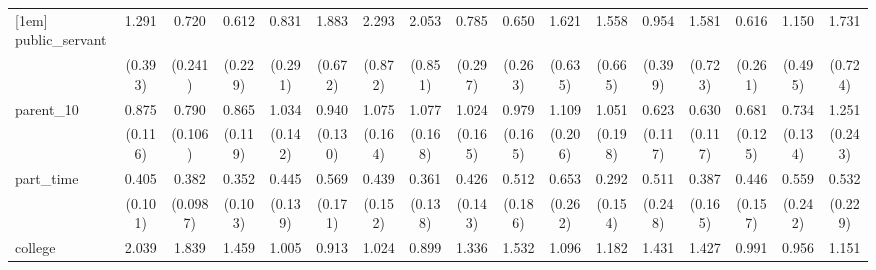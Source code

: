 {\begin{tabular}{l*{16}{c}}
[1em]
public\_servant      &       1.291         &       0.720         &       0.612         &       0.831         &       1.883         &       2.293\sym{*}  &       2.053         &       0.785         &       0.650         &       1.621         &       1.558         &       0.954         &       1.581         &       0.616         &       1.150         &       1.731         \\
                    &     (0.393)         &     (0.241)         &     (0.229)         &     (0.291)         &     (0.672)         &     (0.872)         &     (0.851)         &     (0.297)         &     (0.263)         &     (0.635)         &     (0.665)         &     (0.399)         &     (0.723)         &     (0.261)         &     (0.495)         &     (0.724)         \\
[1em]
parent\_10           &       0.875         &       0.790         &       0.865         &       1.034         &       0.940         &       1.075         &       1.077         &       1.024         &       0.979         &       1.109         &       1.051         &       0.623\sym{*}  &       0.630\sym{*}  &       0.681\sym{*}  &       0.734         &       1.251         \\
                    &     (0.116)         &     (0.106)         &     (0.119)         &     (0.142)         &     (0.130)         &     (0.164)         &     (0.168)         &     (0.165)         &     (0.165)         &     (0.206)         &     (0.198)         &     (0.117)         &     (0.117)         &     (0.125)         &     (0.134)         &     (0.243)         \\
[1em]
part\_time           &       0.405\sym{***}&       0.382\sym{***}&       0.352\sym{***}&       0.445\sym{**} &       0.569         &       0.439\sym{*}  &       0.361\sym{**} &       0.426\sym{*}  &       0.512         &       0.653         &       0.292\sym{*}  &       0.511         &       0.387\sym{*}  &       0.446\sym{*}  &       0.559         &       0.532         \\
                    &     (0.101)         &    (0.0987)         &     (0.103)         &     (0.139)         &     (0.171)         &     (0.152)         &     (0.138)         &     (0.143)         &     (0.186)         &     (0.262)         &     (0.154)         &     (0.248)         &     (0.165)         &     (0.157)         &     (0.242)         &     (0.229)         \\
[1em]
college             &       2.039\sym{***}&       1.839\sym{**} &       1.459         &       1.005         &       0.913         &       1.024         &       0.899         &       1.336         &       1.532         &       1.096         &       1.182         &       1.431         &       1.427         &       0.991         &       0.956         &       1.151         \\

\end{tabular}}
